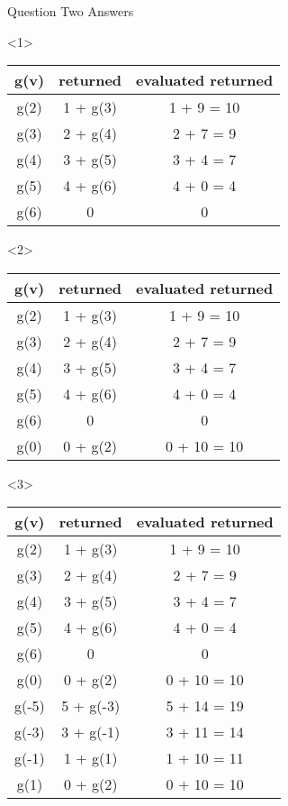 \documentclass[12]{beamer}
\begin{document}
\begin{frame}[t, fragile]{Question Two Answers} \vspace{4pt}
\begin{center}
\begin{onlyenv}<1>
\begin{tabular}{ |c|c|c| } 
\hline
g(v) & returned & evaluated returned \\
 \hline
 g(2) & 1 + g(3) & 1 + 9 = 10 \\ 
 g(3) & 2 + g(4) & 2 + 7 = 9 \\ 
 g(4) & 3 + g(5) & 3 + 4 = 7 \\ 
 g(5) & 4 + g(6) & 4 + 0 = 4 \\ 
 g(6) & 0 & 0 \\
 \hline
\end{tabular}
\end{onlyenv}
\begin{onlyenv}<2>
\begin{tabular}{ |c|c|c| } 
\hline
g(v) & returned & evaluated returned \\
 \hline
 g(2) & 1 + g(3) & 1 + 9 = 10 \\ 
 g(3) & 2 + g(4) & 2 + 7 = 9 \\ 
 g(4) & 3 + g(5) & 3 + 4 = 7 \\ 
 g(5) & 4 + g(6) & 4 + 0 = 4 \\ 
 g(6) & 0 & 0 \\ 
 \hline
 g(0) & 0 + g(2) & 0 + 10 = 10 \\
 \hline
\end{tabular}
\end{onlyenv}
\begin{onlyenv}<3>
\begin{tabular}{ |c|c|c| } 
\hline
g(v) & returned & evaluated returned \\
 \hline
 g(2) & 1 + g(3) & 1 + 9 = 10 \\ 
 g(3) & 2 + g(4) & 2 + 7 = 9 \\ 
 g(4) & 3 + g(5) & 3 + 4 = 7 \\ 
 g(5) & 4 + g(6) & 4 + 0 = 4 \\ 
 g(6) & 0 & 0 \\ 
 \hline
 g(0) & 0 + g(2) & 0 + 10 = 10 \\
 \hline
 g(-5) & 5 + g(-3) & 5 + 14 = 19 \\
 g(-3) & 3 + g(-1) & 3 + 11 = 14 \\
 g(-1) & 1 + g(1) & 1 + 10 = 11 \\
 g(1) & 0 + g(2) & 0 + 10 = 10 \\
 \hline
\end{tabular}
\end{onlyenv}
\end{center}
\end{frame}
\end{document}
